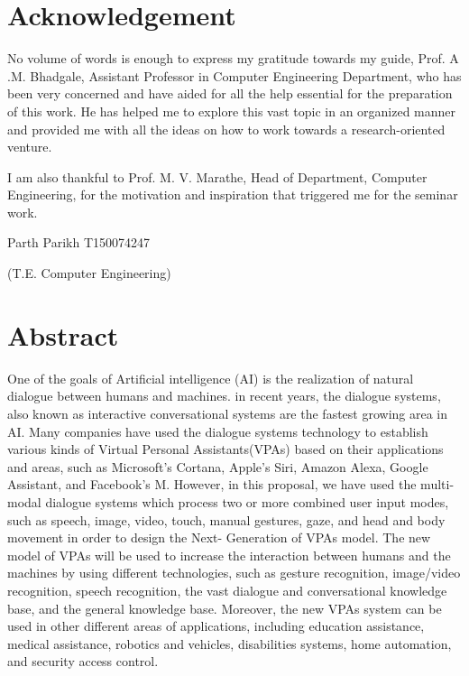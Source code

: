 \documentclass[14pt,a4paper]{article}
\begin{document}
\newpage
\cleardoublepage
\thispagestyle{empty}
\section{Acknowledgement}
\noindent
\par No volume of words is enough to express my gratitude towards my guide, Prof. A .M. Bhadgale, Assistant Professor in Computer Engineering Department, who has been very concerned and have aided for all the help essential for the preparation of this work. He has helped me to explore this vast topic in an organized manner and provided me with all the ideas on how to work towards a research-oriented venture.
\par  I am also thankful to Prof. M. V. Marathe, Head of Department, Computer Engineering, for the motivation and inspiration that triggered me for the seminar work.

\par
Parth Parikh  T150074247\par
(T.E. Computer Engineering)


\newpage

\section{Abstract}
\noindent
\par One of the goals of Artificial intelligence (AI) is the
realization of natural dialogue between humans and machines.
in recent years, the dialogue systems, also known as interactive
conversational systems are the fastest growing area in AI. Many
companies have used the dialogue systems technology to establish
various kinds of Virtual Personal Assistants(VPAs) based on
their applications and areas, such as Microsoft’s Cortana,
Apple’s Siri, Amazon Alexa, Google Assistant, and Facebook’s
M. However, in this proposal, we have used the multi-modal
dialogue systems which process two or more combined user input
modes, such as speech, image, video, touch, manual gestures,
gaze, and head and body movement in order to design the Next-
Generation of VPAs model. The new model of VPAs will be used
to increase the interaction between humans and the machines by
using different technologies, such as gesture recognition,
image/video recognition, speech recognition, the vast dialogue
and conversational knowledge base, and the general knowledge
base. Moreover, the new VPAs system can be used in other
different areas of applications, including education assistance,
medical assistance, robotics and vehicles, disabilities systems,
home automation, and security access control.
\newpage
\tableofcontents
\newpage
\end{document}
